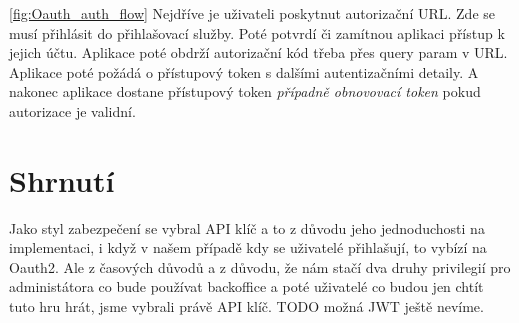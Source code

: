 \ref{fig:Oauth_auth_flow} Nejdříve je uživateli poskytnut autorizační URL. Zde se musí přihlásit do přihlašovací služby. Poté potvrdí či zamítnou aplikaci přístup k jejich účtu. Aplikace poté obdrží autorizační kód třeba přes query param %
v URL. Aplikace poté požádá o přístupový token s dalšími autentizačními detaily. A nakonec aplikace dostane přístupový token \textit{případně obnovovací token} pokud autorizace je validní.

\section{Shrnutí}
Jako styl zabezpečení se vybral API klíč a to z důvodu jeho jednoduchosti na implementaci, i když v našem případě kdy se uživatelé přihlašují, to vybízí na Oauth2. Ale z časových důvodů a z důvodu, že nám stačí dva druhy privilegií pro administátora co bude používat backoffice a poté uživatelé co budou jen chtít tuto hru hrát, jsme vybrali právě API klíč. TODO možná JWT ještě nevíme.

